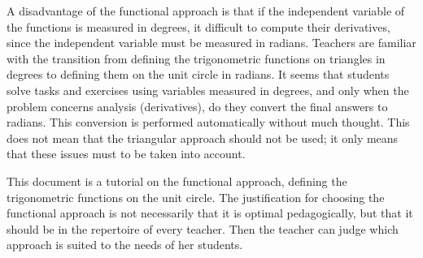 A disadvantage of the functional approach is that if the independent variable of the functions is measured in degrees, it difficult to compute their derivatives, since the independent variable must be measured in radians.
Teachers are familiar with the transition from defining the trigonometric functions on triangles in degrees to defining them on the unit circle in radians.
It seems that students solve tasks and exercises using variables measured in degrees, and only when the problem concerns analysis (derivatives), do they convert the final answers to radians.
This conversion is performed automatically without much thought.
This does not mean that the triangular approach should not be used; it only means that these issues must  to be taken into account.

This document is a tutorial on the functional approach, defining the trigonometric functions on the unit circle.
The justification for choosing the functional approach is not necessarily that it is optimal pedagogically, but that it should be in the repertoire of every teacher.
Then the teacher can judge which approach is suited to the needs of her students.
